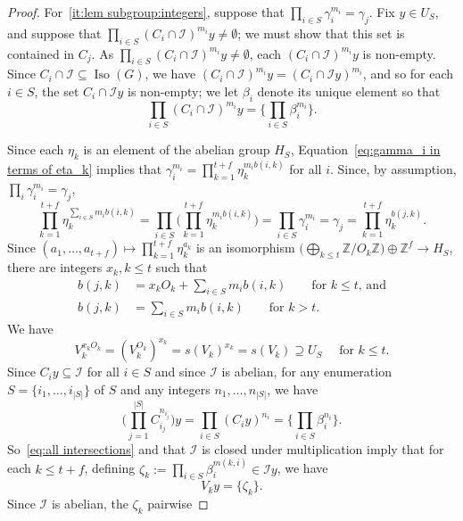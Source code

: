 \documentclass[a4paper, 12pt]{amsart}
\theoremstyle{plain}
\theoremstyle{definition}
\theoremstyle{remark}
\newcommand{\Iso}{\operatorname{Iso}}
\newcommand{\Ii}{\mathcal{I}}
\numberwithin{equation}{section}
\begin{document}
\begin{proof}
For~\ref{it:lem subgroup:integers}, suppose that $\prod_{i \in S} \gamma_i^{m_i} = \gamma_j$. Fix $y \in
U_S$, and suppose that $\prod_{i\in S}(C_i\cap \Ii)^{m_i}y\neq \emptyset$; we must show that this set is contained in $C_{j}$.
As $\prod_{i\in S}(C_i\cap \Ii)^{m_i}y\neq \emptyset$, each $(C_i\cap \Ii)^{m_i}y$ is non-empty. Since
$C_i\cap\Ii\subseteq \Iso(G)$, we have $(C_i\cap \Ii)^{m_i}y = (C_i\cap \Ii y)^{m_i}$, and so for each $i\in S$,
the set $C_i\cap \Ii y$ is non-empty; we let $\beta_i$ denote its unique element so that
\[
\prod_{i\in S}(C_i\cap \Ii)^{m_i}y = \Big\{\prod_{i \in S} \beta_i^{m_i}\Big\}.
\]


Since each $\eta_k$ is an element of the abelian group $H_{S}$, Equation~\eqref{eq:gamma_i in terms of eta_k} implies that
$\gamma_i^{m_i} = \prod^{t+f}_{k=1} \eta_k^{m_i b(i,k)}$ for all $i$. Since, by assumption, $\prod_i \gamma_i^{m_i} = \gamma_j$,
\[
\prod^{t+f}_{k=1} \eta_k^{\sum_{i\in S} m_i b(i,k)}
    = \prod_{i \in S} \Big(\prod^{t+f}_{k=1} \eta_k^{m_i b(i,k)}\Big)
    = \prod_{i \in S} \gamma_i^{m_i}
    = \gamma_j
    = \prod^{t+f}_{k=1} \eta_k^{b(j,k)}.
\]
Since $(a_1, \dots, a_{t+f}) \mapsto \prod^{t+f}_{k=1} \eta_k^{a_k}$ is an
isomorphism $\big(\bigoplus_{k \le t} \mathbb{Z}/O_k\mathbb{Z}\big) \oplus
\mathbb{Z}^f \to H_S$, there are integers $x_k, k \le t$ such that
\begin{align}
b(j,k)&= x_k O_k + \sum_{i \in  S } m_i b(i,k)\qquad\text{for $k \le t$, and}\label{eq:klet case} \\
b(j,k) &= \sum_{i \in  S } m_i b(i,k)\qquad\text{for $k > t$.}\label{eq:k>t case}
\end{align}
We have
\begin{equation}\label{eq:torsion}
V_k^{x_k O_k} = (V_k^{O_k})^{x_k} = s(V_k)^{x_k} = s(V_k) \supseteq U_S\quad\text{ for $k \le t$.}
\end{equation}
Since $C_{i}y\subseteq \Ii$ for all $i\in S$ and since $\Ii$ is abelian, for
any enumeration $S = \{i_1, \dots, i_{|S|}\}$ of $S$ and any integers
$n_{1},\ldots,n_{|S|}$, we have
\[
\Big(\prod^{|S|}_{j=1} C_{i_j}^{n_{i_j}}\Big)y
    = \prod_{i\in S} (C_{i}y)^{n_i}
    = \Big\{ \prod_{i\in S} \beta_{i}^{n_i}\Big\}.
\]
So~\eqref{eq:all intersections} and that $\Ii$ is closed under multiplication
imply that for each $k\le t+f$, defining $\zeta_k := \prod_{i \in S}
\beta_i^{m(k,i)} \in  \Ii y$, we have
\begin{equation}\label{eq:prod beta i}
V_k y = \{\zeta_k\}.
\end{equation}
Since $\Ii$ is abelian, the $\zeta_k$ pairwise

\end{proof}
\end{document}
